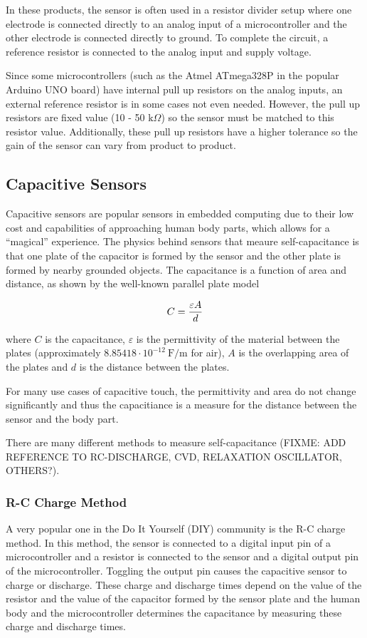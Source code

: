 \documentclass{sigchi}
\begin{document}
In these products, the sensor is often used in a resistor divider setup where
one electrode is connected directly to an analog input of a microcontroller and
the other electrode is connected directly to ground. To complete the circuit, a
reference resistor is connected to the analog input and supply voltage.

Since some microcontrollers (such as the Atmel ATmega328P in the popular Arduino
UNO board) have internal pull up resistors on the analog inputs, an external
reference resistor is in some cases not even needed. However, the pull up
resistors are fixed value (10 - 50 $\textrm{k}\Omega$) so the sensor must be matched to
this resistor value. Additionally, these pull up resistors have a higher
tolerance so the gain of the sensor can vary from product to product.

\subsection{Capacitive Sensors}
Capacitive sensors are popular sensors in embedded computing due to their low cost
and capabilities of approaching human body parts, which allows for a ``magical''
experience. The physics behind sensors that meaure self-capacitance is that one
plate of the capacitor is formed by the sensor and the other plate is formed by
nearby grounded objects. The capacitance is a function of area and distance, as
shown by the well-known parallel plate model

\begin{equation}
C = {{\varepsilon A} \over {d}}
\end{equation}

where $C$ is the capacitance, $\varepsilon$ is the permittivity of the material
between the plates (approximately $8.85418 \cdot 10^{-12} ~ \textrm{F/m}$ for
air), $A$ is the overlapping area of the plates and $d$ is the distance between
the plates.

For many use cases of capacitive touch, the permittivity and area do not change
significantly and thus the capacitiance is a measure for the distance between
the sensor and the body part.

There are many different methods to measure
self-capacitance (FIXME: ADD REFERENCE TO RC-DISCHARGE, CVD, RELAXATION
OSCILLATOR, OTHERS?). 

\subsubsection{R-C Charge Method}
A very popular one in the Do It Yourself (DIY) community is the R-C charge
method. In this method, the sensor is connected to a digital input pin of a
microcontroller and a resistor is connected to the sensor and a digital output
pin of the microcontroller. Toggling the output pin causes the capacitive sensor
to charge or discharge. These charge and discharge times depend on the value of
the resistor and the value of the capacitor formed by the sensor plate and the
human body and the microcontroller determines the capacitance by measuring these
charge and discharge times.
\end{document}
